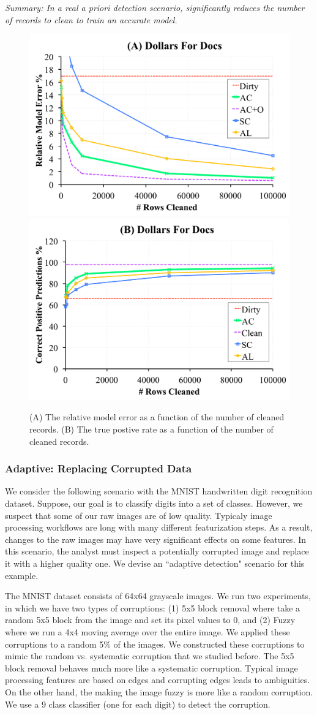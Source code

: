 \vspace{0.25em}

\noindent \emph{Summary: In a real a priori detection scenario, \sys significantly reduces the number of records to clean to train an accurate model. }

\begin{figure}[ht!]
\centering
 \includegraphics[width=0.49\columnwidth]{exp/exp13a.pdf}
 \includegraphics[width=0.49\columnwidth]{exp/exp13b.pdf}
 \caption{(A) The relative model error as a function of the number of cleaned records. (B) The true postive rate as a function of the number of cleaned records. \label{dfd}}
\end{figure}

\subsubsection{Adaptive: Replacing Corrupted Data}
We consider the following scenario with the MNIST handwritten digit recognition dataset.
Suppose, our goal is to classify digits into a set of classes.
However, we suspect that some of our raw images are of low quality.
Typicaly image processing workflows are long with many different featurization steps.
As a result, changes to the raw images may have very significant effects on some features.
In this scenario, the analyst must inspect a potentially corrupted image and replace it with a higher quality one.
We devise an ``adaptive detection" \sys scenario for this example.

The MNIST dataset consists of 64x64 grayscale images.
We run two experiments, in which we have two types of corruptions: (1) 5x5 block removal where take a random 5x5 block from the image and set its pixel values to 0, and (2) Fuzzy where we run a 4x4 moving average over the entire image.
We applied these corruptions to a random 5\% of the images.
We constructed these corruptions to mimic the random vs. systematic corruption that we studied before.
The 5x5 block removal behaves much more like a systematic corruption. 
Typical image processing features are based on edges and corrupting edges leads to ambiguities.
On the other hand, the making the image fuzzy is more like a random corruption.
We use a 9 class classifier (one for each digit) to detect the corruption.


